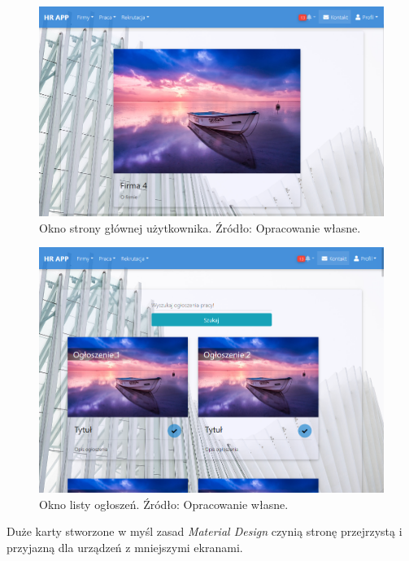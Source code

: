 \documentclass[twoside]{projektInzynierskiMS}
\numberwithin{figure}{section}
\begin{document}
\begin{figure}[h!]
    \centering
    \includegraphics[width = \textwidth, scale=0.7]{images/stronaGłównaZalogowanyUser.png}
    \caption{Okno strony głównej użytkownika. Źródło: Opracowanie własne.}
    \label{fig:okno_strony_głównej_użytkownika}
\end{figure}

\newpage

\begin{figure}[h!]
    \centering
    \includegraphics[width = \textwidth]{images/listaOgłoszeń.png}
    \caption{Okno listy ogłoszeń. Źródło: Opracowanie własne.}
    \label{fig:okno_listy_ogłoszeń}
\end{figure}

Duże karty stworzone w myśl zasad \textit{Material Design} czynią stronę przejrzystą i przyjazną dla urządzeń z mniejszymi ekranami.
\end{document}
